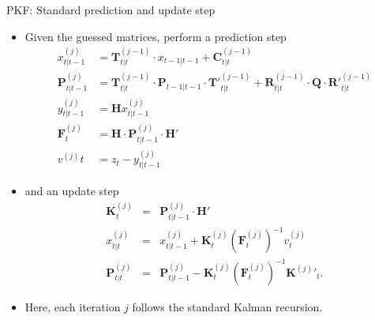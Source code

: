 \begin{frame}{PKF: Standard prediction and update step}
	\label{details_pred_upd}
\begin{itemize}
\item Given the guessed matrices, perform a prediction step
\begin{align*}
x^{(j)}_{t|t-1}&=\mathbf{T}^{(j-1)}_{t|t}\cdot x_{t-1|t-1}+\mathbf{C}^{(j-1)}_{t|t} \\
\mathbf{P}^{(j)}_{t|t-1}&=\mathbf{T}^{(j-1)}_{t|t}\cdot \mathbf{P}_{t-1|t-1}\cdot \mathbf{T'}^{(j-1)}_{t|t} +\mathbf{R}^{(j-1)}_{t|t}\cdot \mathbf{Q}\cdot \mathbf{R'}^{(j-1)}_{t|t}\\
y^{(j)}_{t|t-1}&=\mathbf{H} x^{(j)}_{t|t-1}\\
\mathbf{F}^{(j)}_{t}&=\mathbf{H}\cdot \mathbf{P}^{(j)}_{t|t-1}\cdot \mathbf{H}'\\
v^{(j)}{t}&= z_t-y^{(j)}_{t|t-1} 
\end{align*}
\item and an update step
\begin{eqnarray*}\label{eq:update1}
\mathbf{K}^{(j)}_t  &=&  \mathbf{P}^{(j)}_{t|t-1}\cdot\mathbf{H}'\\
x^{(j)}_{t|t} &=& x^{(j)}_{t|t-1}+\mathbf{K}^{(j)}_t \left(\mathbf{F}^{(j)}_{t}\right)^{-1}v^{(j)}_t  \nonumber\\ 
\mathbf{P}^{(j)}_{t|t} &=& \mathbf{P}^{(j)}_{t|t-1}-\mathbf{K}^{(j)}_t\left(\mathbf{F}^{(j)}_{t}\right)^{-1} {\mathbf{K}^{(j)}}'_t. \nonumber
\end{eqnarray*}
\item Here, each iteration $j$ follows the standard Kalman recursion.
\end{itemize}
	\hyperlink{pkf_pred_upd}{}
\end{frame}




